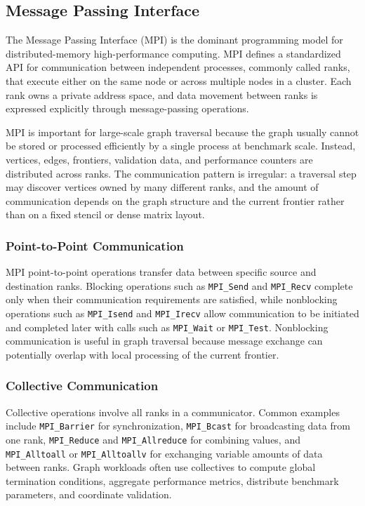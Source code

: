 \documentclass{article}
\begin{document}
\subsection{Message Passing Interface}

The Message Passing Interface (MPI) is the dominant programming model for distributed-memory high-performance computing. MPI defines a standardized API for communication between independent processes, commonly called ranks, that execute either on the same node or across multiple nodes in a cluster. Each rank owns a private address space, and data movement between ranks is expressed explicitly through message-passing operations.

MPI is important for large-scale graph traversal because the graph usually cannot be stored or processed efficiently by a single process at benchmark scale. Instead, vertices, edges, frontiers, validation data, and performance counters are distributed across ranks. The communication pattern is irregular: a traversal step may discover vertices owned by many different ranks, and the amount of communication depends on the graph structure and the current frontier rather than on a fixed stencil or dense matrix layout.

\subsubsection*{Point-to-Point Communication}

MPI point-to-point operations transfer data between specific source and destination ranks. Blocking operations such as \texttt{MPI\_Send} and \texttt{MPI\_Recv} complete only when their communication requirements are satisfied, while nonblocking operations such as \texttt{MPI\_Isend} and \texttt{MPI\_Irecv} allow communication to be initiated and completed later with calls such as \texttt{MPI\_Wait} or \texttt{MPI\_Test}. Nonblocking communication is useful in graph traversal because message exchange can potentially overlap with local processing of the current frontier.

\subsubsection*{Collective Communication}

Collective operations involve all ranks in a communicator. Common examples include \texttt{MPI\_Barrier} for synchronization, \texttt{MPI\_Bcast} for broadcasting data from one rank, \texttt{MPI\_Reduce} and \texttt{MPI\_Allreduce} for combining values, and \texttt{MPI\_Alltoall} or \texttt{MPI\_Alltoallv} for exchanging variable amounts of data between ranks. Graph workloads often use collectives to compute global termination conditions, aggregate performance metrics, distribute benchmark parameters, and coordinate validation.
\end{document}
